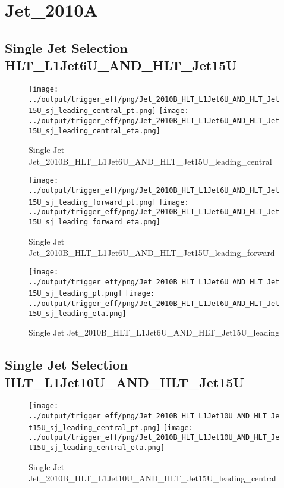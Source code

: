 \documentclass[11pt]{article}
\begin{document}
\cleardoublepage

\newpage
\section{Jet\_2010A}

\subsection{Single Jet Selection HLT\_L1Jet6U\_AND\_HLT\_Jet15U}
\begin{figure}[ht]
\centering
\texttt{[image: ../output/trigger\_eff/png/Jet\_2010B\_HLT\_L1Jet6U\_AND\_HLT\_Jet15U\_sj\_leading\_central\_pt.png]}
\texttt{[image: ../output/trigger\_eff/png/Jet\_2010B\_HLT\_L1Jet6U\_AND\_HLT\_Jet15U\_sj\_leading\_central\_eta.png]}
\caption{Single Jet Jet\_2010B\_HLT\_L1Jet6U\_AND\_HLT\_Jet15U\_leading\_central}
\label{fig:jet_sj_L1Jet6U_AND_HLT_Jet15U_leading_central}
\end{figure}

\begin{figure}[ht]
\centering
\texttt{[image: ../output/trigger\_eff/png/Jet\_2010B\_HLT\_L1Jet6U\_AND\_HLT\_Jet15U\_sj\_leading\_forward\_pt.png]}
\texttt{[image: ../output/trigger\_eff/png/Jet\_2010B\_HLT\_L1Jet6U\_AND\_HLT\_Jet15U\_sj\_leading\_forward\_eta.png]}
\caption{Single Jet Jet\_2010B\_HLT\_L1Jet6U\_AND\_HLT\_Jet15U\_leading\_forward}
\label{fig:jet_sj_L1Jet6U_AND_HLT_Jet15U_leading_forward}
\end{figure}

\begin{figure}[ht]
\centering
\texttt{[image: ../output/trigger\_eff/png/Jet\_2010B\_HLT\_L1Jet6U\_AND\_HLT\_Jet15U\_sj\_leading\_pt.png]}
\texttt{[image: ../output/trigger\_eff/png/Jet\_2010B\_HLT\_L1Jet6U\_AND\_HLT\_Jet15U\_sj\_leading\_eta.png]}
\caption{Single Jet Jet\_2010B\_HLT\_L1Jet6U\_AND\_HLT\_Jet15U\_leading}
\label{fig:jet_sj_L1Jet6U_AND_HLT_Jet15U_leading}
\end{figure}

\newpage
\subsection{Single Jet Selection HLT\_L1Jet10U\_AND\_HLT\_Jet15U}
\begin{figure}[ht]
\centering
\texttt{[image: ../output/trigger\_eff/png/Jet\_2010B\_HLT\_L1Jet10U\_AND\_HLT\_Jet15U\_sj\_leading\_central\_pt.png]}
\texttt{[image: ../output/trigger\_eff/png/Jet\_2010B\_HLT\_L1Jet10U\_AND\_HLT\_Jet15U\_sj\_leading\_central\_eta.png]}
\caption{Single Jet Jet\_2010B\_HLT\_L1Jet10U\_AND\_HLT\_Jet15U\_leading\_central}
\label{fig:jet_sj_L1Jet10U_AND_HLT_Jet15U_leading_central}
\end{figure}
\end{document}

